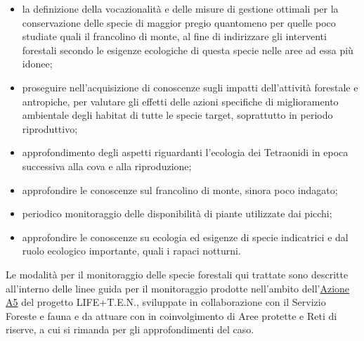 \documentclass[10pt,twoside,openany,x11names,svgnames,italian,a5paper,dvipsnames,table]{memoir}
\begin{document}
\begin{itemize}
  \item la definizione della vocazionalità e delle misure di gestione ottimali per la conservazione delle specie di maggior pregio quantomeno per quelle poco studiate quali il francolino di monte, al fine di indirizzare gli interventi forestali secondo le esigenze ecologiche di questa specie nelle aree ad essa più idonee;
  \item proseguire nell’acquisizione di conoscenze sugli impatti dell’attività forestale e antropiche, per valutare gli effetti delle azioni specifiche di miglioramento ambientale degli habitat di tutte le specie target, soprattutto in periodo riproduttivo;
  \item approfondimento degli aspetti riguardanti l’ecologia dei Tetraonidi in epoca successiva alla cova e alla riproduzione;
  \item approfondire le conoscenze sul francolino di monte, sinora poco indagato;
  \item periodico monitoraggio delle disponibilità di piante utilizzate dai picchi;
  \item approfondire le conoscenze su ecologia ed esigenze di specie indicatrici e dal ruolo ecologico importante, quali i rapaci notturni.
\end{itemize}

Le modalità per il monitoraggio delle specie forestali qui trattate sono descritte all'interno delle linee guida per il monitoraggio prodotte nell’ambito dell'\href{http://www.lifeten.tn.it/actions/preliminary_actions/pagina5.html}{Azione A5} del progetto LIFE+T.E.N., sviluppate in collaborazione con il Servizio Foreste e fauna e da attuare con in coinvolgimento di Aree protette e Reti di riserve, a cui si rimanda per gli approfondimenti del caso. 




 
\setlength\afterchapskip{10mm}
\end{document}

